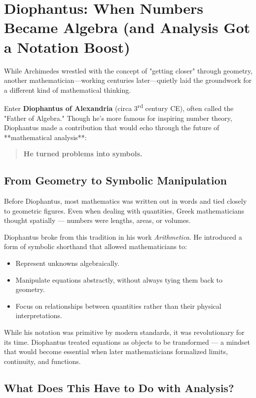 \section{Diophantus: When Numbers Became Algebra (and Analysis Got a Notation Boost)}

While Archimedes wrestled with the concept of "getting closer" through geometry, another mathematician—working centuries later—quietly laid the groundwork for a different kind of mathematical thinking.

Enter \textbf{Diophantus of Alexandria} (circa 3\textsuperscript{rd} century CE), often called the "Father of Algebra." Though he's more famous for inspiring number theory, Diophantus made a contribution that would echo through the future of **mathematical analysis**:

\begin{quote}
\textbf{He turned problems into symbols.}
\end{quote}

\subsection{From Geometry to Symbolic Manipulation}

Before Diophantus, most mathematics was written out in words and tied closely to geometric figures. Even when dealing with quantities, Greek mathematicians thought spatially — numbers were lengths, areas, or volumes.

Diophantus broke from this tradition in his work \textit{Arithmetica}. He introduced a form of symbolic shorthand that allowed mathematicians to:

\begin{itemize}
  \item Represent unknowns algebraically.
  \item Manipulate equations abstractly, without always tying them back to geometry.
  \item Focus on relationships between quantities rather than their physical interpretations.
\end{itemize}

While his notation was primitive by modern standards, it was revolutionary for its time. Diophantus treated equations as objects to be transformed — a mindset that would become essential when later mathematicians formalized limits, continuity, and functions.

\subsection{What Does This Have to Do with Analysis?}

